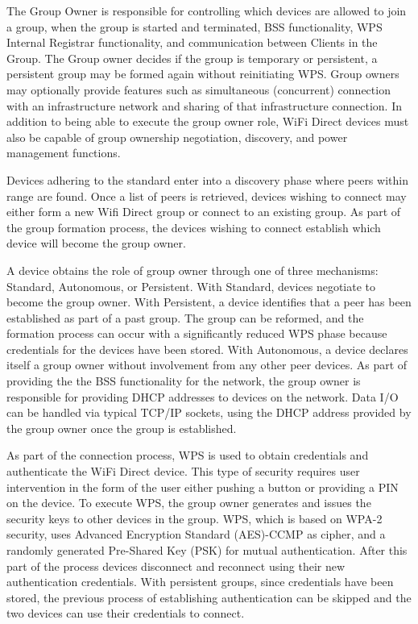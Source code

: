 \documentclass[10pt,twocolumn]{article}
\begin{document}
The Group Owner is responsible for controlling which devices are allowed to join a group, when the group is started and terminated, BSS functionality, WPS Internal Registrar functionality, and communication between Clients in the Group. 
The Group owner decides if the group is temporary or persistent, a persistent group may be formed again without reinitiating WPS.
Group owners may optionally provide features such as simultaneous (concurrent) connection with an infrastructure network and sharing of that infrastructure connection. 
In addition to being able to execute the group owner role, WiFi Direct devices must also be capable of group ownership negotiation, discovery, and power management functions.
 
Devices adhering to the standard enter into a discovery phase where peers within range are found. 
Once a list of peers is retrieved, devices wishing to connect may either form a new  Wifi Direct group or connect to an existing group. 
As part of the group formation process, the devices wishing to connect establish which device will become the group owner.

A device obtains the role of group owner through one of three mechanisms: Standard, Autonomous, or Persistent. 
With Standard, devices negotiate to become the group owner.
With Persistent, a device identifies that a peer has been established as part of a past group. 
The group can be reformed, and the formation process can occur with a significantly reduced WPS phase because credentials for the devices have been stored.
With Autonomous, a device declares itself a group owner without involvement from any other peer devices. 
As part of providing the the BSS functionality for the network, the group owner is responsible for providing DHCP addresses to devices on the network.
Data I/O can be handled via typical TCP/IP sockets, using the DHCP address provided by the group owner once the group is established\cite{wifiwhitepaper}.

As part of the connection process, WPS is used to obtain credentials and authenticate the WiFi Direct device.  
This type of security requires user intervention in the form of the user either pushing a button or providing a PIN on the device.
To execute WPS, the group owner generates and issues the security keys to other devices in the group. 
WPS, which is based on WPA-2 security, uses Advanced Encryption Standard (AES)-CCMP as cipher, and a randomly generated Pre-Shared Key (PSK) for mutual authentication\cite{wifiwhitepaper}.
After this part of the process devices disconnect and reconnect using their new authentication credentials.
With persistent groups, since credentials have been stored, the previous process of establishing authentication can be skipped and the two devices can use their credentials to connect.
\end{document}
